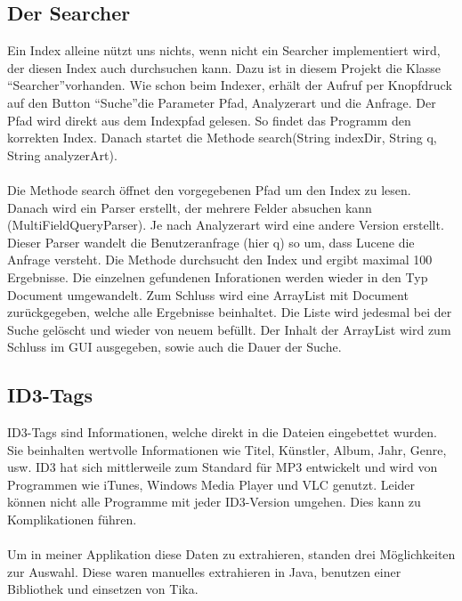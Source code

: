 \documentclass[12pt,a4paper,ngerman]{report}
\begin{document}
\subsection{Der Searcher}
Ein Index alleine nützt uns nichts, wenn nicht ein Searcher implementiert wird, der diesen Index auch durchsuchen kann. Dazu ist in diesem Projekt die Klasse \textquotedblleft Searcher\textquotedblright vorhanden. Wie schon beim Indexer, erhält der Aufruf per Knopfdruck auf den Button \textquotedblleft Suche\textquotedblright die Parameter Pfad, Analyzerart und die Anfrage. Der Pfad wird direkt aus dem Indexpfad gelesen. So findet das Programm den korrekten Index. Danach startet die Methode search(String indexDir, String q, String analyzerArt).\\
\\
Die Methode search öffnet den vorgegebenen Pfad um den Index zu lesen. Danach wird ein Parser erstellt, der mehrere Felder absuchen kann (MultiFieldQueryParser). Je nach Analyzerart wird eine andere Version erstellt. Dieser Parser wandelt die Benutzeranfrage (hier q) so um, dass Lucene die Anfrage versteht. Die Methode durchsucht den Index und ergibt maximal 100 Ergebnisse. Die einzelnen gefundenen Inforationen werden wieder in den Typ Document umgewandelt. Zum Schluss wird eine ArrayList mit Document zurückgegeben, welche alle Ergebnisse beinhaltet. Die Liste wird jedesmal bei der Suche gelöscht und wieder von neuem befüllt. Der Inhalt der ArrayList wird zum Schluss im GUI ausgegeben, sowie auch die Dauer der Suche.
\subsection{ID3-Tags}
ID3-Tags sind Informationen, welche direkt in die Dateien eingebettet wurden. Sie beinhalten wertvolle Informationen wie Titel, Künstler, Album, Jahr, Genre, usw. ID3 hat sich mittlerweile zum Standard für MP3 entwickelt und wird von Programmen wie iTunes, Windows Media Player und VLC genutzt. Leider können nicht alle Programme mit jeder ID3-Version umgehen. Dies kann zu Komplikationen führen.\\
\\
Um in meiner Applikation diese Daten zu extrahieren, standen drei Möglichkeiten zur Auswahl. Diese waren manuelles extrahieren in Java, benutzen einer Bibliothek und einsetzen von Tika.
\end{document}
